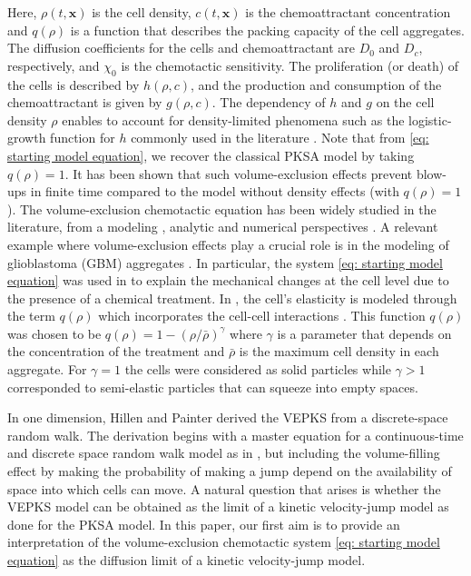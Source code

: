 \documentclass{aims} %
\theoremstyle{definition}
\begin{document}
{Here, $\rho(t,\mathbf{x})$ is the cell density, $c(t,\mathbf{x})$ is the chemoattractant concentration and  $q(\rho)$ is a function that describes the packing capacity of the cell aggregates.  The diffusion coefficients for the cells and chemoattractant are $D_0$ and $D_c$, respectively, and $\chi_0$ is the chemotactic sensitivity. The proliferation (or death) of the cells is described by $h(\rho,c)$,  and the production and consumption of the chemoattractant is given by $g(\rho,c)$. The dependency of $h$ and $g$ on the cell density $\rho$ enables to account for density-limited phenomena such as the logistic-growth function for $h$ commonly used in the literature \cite{murray2002introduction,murray2003mathematical}. Note that from \eqref{eq: starting model equation}, we recover the classical PKSA model by taking $q(\rho) = 1$.  It has been shown \cite{calvez2006volume,wrzosek2010volume,zheng2015boundedness} that such volume-exclusion effects prevent blow-ups in finite time compared to the model without density effects (with $q(\rho) = 1$). The volume-exclusion chemotactic equation has been widely studied in the literature, from a modeling \cite{painter2002volume,wang2010chemotaxis}, analytic \cite{dolak2005keller,han2017pattern,ma2012stationary,wrzosek2010volume} and numerical perspectives \cite{ibrahim2014efficacy}. A relevant example where volume-exclusion effects play a crucial role is in the modeling of glioblastoma (GBM) aggregates  \cite{Vital2011}. In particular, the  system \eqref{eq: starting model equation} was used in \cite{almeida2020treatment} to explain the mechanical changes at the cell level  due to the presence of a chemical treatment. In \cite{almeida2020treatment}, the cell's elasticity is modeled through the term $q(\rho)$ which incorporates the cell-cell interactions \cite{wang2007classical}. This function $q(\rho)$ was chosen to be $q(\rho)=1-(\rho/\bar{\rho})^\gamma$ where $\gamma$ is a parameter that depends on the concentration of the treatment and $\bar{\rho}$ is the maximum cell density in each aggregate. For $\gamma=1$ the cells were considered as solid particles while {$\gamma>1$  corresponded to semi-elastic particles} that can squeeze into empty spaces. 

In one dimension, Hillen and Painter \cite{painter2002volume} derived the VEPKS from a discrete-space random walk. The derivation begins with a master equation for a continuous-time and discrete space random walk model as in \cite{Othmer1997}, but including the volume-filling effect by making the probability of making a jump depend on the availability of space into which cells can move.  A natural question that arises is whether the VEPKS model can be obtained as the limit of a kinetic velocity-jump model as done for the PKSA model. 
In this paper, our first aim is to provide an interpretation of the volume-exclusion chemotactic system \eqref{eq: starting model equation} as the diffusion limit of a kinetic {{velocity-jump}} model.

}
\end{document}

